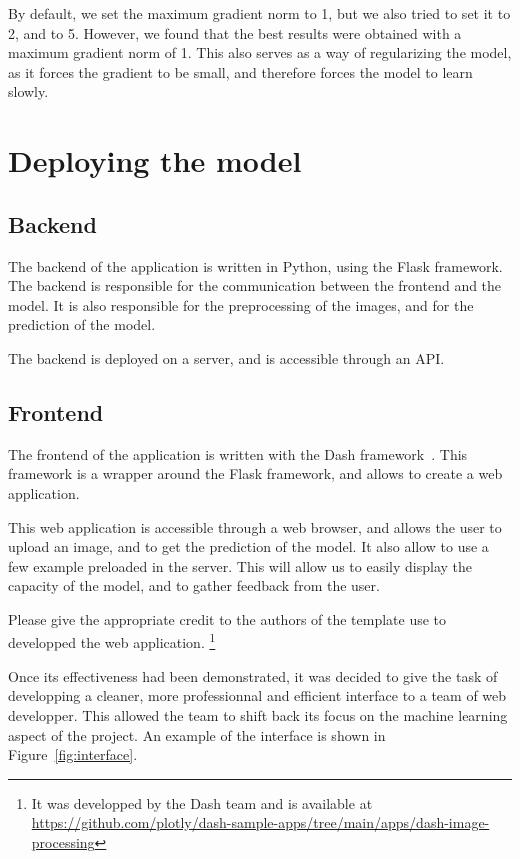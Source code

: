 \documentclass[11pt]{article}
\begin{document}
        By default, we set the maximum gradient norm to 1, but we also tried to set it to 2, and to 5. However, we found that the best results were obtained with a maximum gradient norm of 1.
        This also serves as a way of regularizing the model, as it forces the gradient to be small, and therefore forces the model to learn slowly.


    \section{Deploying the model}

        \subsection{Backend}

            The backend of the application is written in Python, using the Flask framework. The backend is responsible for the communication between the frontend and the model.
            It is also responsible for the preprocessing of the images, and for the prediction of the model.

            The backend is deployed on a server, and is accessible through an API.

        \subsection{Frontend}

            The frontend of the application is written with the Dash framework~\cite{dash}. This framework is a wrapper around the Flask framework, and allows to create a web application.

            This web application is accessible through a web browser, and allows the user to upload an image, and to get the prediction of the model. It also allow to use a few example
            preloaded in the server. This will allow us to easily display the capacity of the model, and to gather feedback from the user.

            Please give the appropriate credit to the authors of the template use to developped the web application. \footnote{It was developped by the Dash team and is available
            at \url{https://github.com/plotly/dash-sample-apps/tree/main/apps/dash-image-processing}}

            Once its effectiveness had been demonstrated, it was decided to give the task of developping a cleaner, more professionnal and efficient interface to a team of web developper. This allowed
            the team to shift back its focus on the machine learning aspect of the project. An example of the interface is shown in Figure~\ref{fig:interface}.
\end{document}
